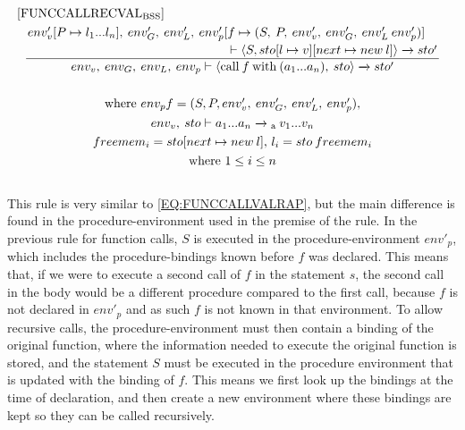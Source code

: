 \begin{equation} \label{EQ:FUNCCALLRECVALRAP}
\centering
\begin{split}
\begin{minipage}{\linewidth}
$[\text{FUNCCALLRECVAL}_\text{BSS}]$
\end{minipage}
\\
\begin{minipage}{\linewidth}
\centering
$
\dfrac
    {
    \splitdfrac
        {
            env'_v[P \mapsto l_1...l_n], \: env'_G, \: env'_L, \: env'_p[f \mapsto (S, \: P, \: env'_v, \: env'_G, \: env'_L \: env'_p)]
        }
        { 
            \vdash \langle S, sto[l \mapsto v][next \mapsto new \: l] \rangle \xrightarrow{} sto'
        }
    }
    {
        env_v, \: env_G, \: env_L, \: env_p \vdash \langle \text{call} \: f \: \text{with} \: (a_1...a_n), \: sto \rangle \xrightarrow{} sto'
    }
$
\end{minipage}
\\\\
\begin{minipage}{\linewidth}
\centering
where $env_p f = (S, P, env'_v, \: env_G', \: env'_L, \: env'_p),$
\end{minipage}
\\
\begin{minipage}{\linewidth}
\centering
$env_v, \: sto \vdash a_1...a_n \xrightarrow{}\textsubscript{a} \: v_1...v_n$
\end{minipage}
\\
\begin{minipage}{\linewidth}
\centering
$freemem_i = sto[next \mapsto new \: l]$, $l_i = sto \: freemem_i$
\end{minipage}
\\
\begin{minipage}{\linewidth}
\centering
where $1 \leq i \leq n $
\end{minipage}
\end{split}
\end{equation}
\\
This rule is very similar to \ref{EQ:FUNCCALLVALRAP}, but the main difference is found in the procedure-environment used in the premise of the rule. In the previous rule for function calls, $S$ is executed in the procedure-environment $env'_p$, which includes the procedure-bindings known before $f$ was declared. This means that, if we were to execute a second call of $f$ in the statement $s$, the second call in the body would be a different procedure compared to the first call, because $f$ is not declared in $env'_p$ and as such $f$ is not known in that environment. To allow recursive calls, the procedure-environment must then contain a binding of the original function, where the information needed to execute the original function is stored, and the statement $S$ must be executed in the procedure environment that is updated with the binding of $f$. This means we first look up the bindings at the time of declaration, and then create a new environment where these bindings are kept so they can be called recursively.


